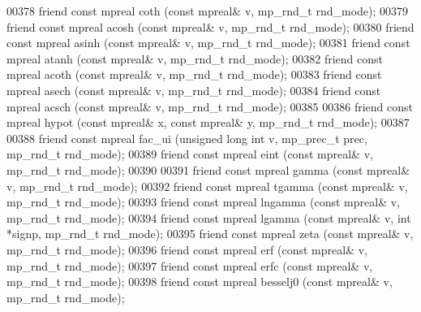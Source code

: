 \begin{DoxyCode}
00378     \textcolor{keyword}{friend} \textcolor{keyword}{const} mpreal coth  (\textcolor{keyword}{const} mpreal& v, mp\_rnd\_t rnd\_mode);
00379     \textcolor{keyword}{friend} \textcolor{keyword}{const} mpreal acosh (\textcolor{keyword}{const} mpreal& v, mp\_rnd\_t rnd\_mode);
00380     \textcolor{keyword}{friend} \textcolor{keyword}{const} mpreal asinh (\textcolor{keyword}{const} mpreal& v, mp\_rnd\_t rnd\_mode);
00381     \textcolor{keyword}{friend} \textcolor{keyword}{const} mpreal atanh (\textcolor{keyword}{const} mpreal& v, mp\_rnd\_t rnd\_mode);
00382     \textcolor{keyword}{friend} \textcolor{keyword}{const} mpreal acoth (\textcolor{keyword}{const} mpreal& v, mp\_rnd\_t rnd\_mode);
00383     \textcolor{keyword}{friend} \textcolor{keyword}{const} mpreal asech (\textcolor{keyword}{const} mpreal& v, mp\_rnd\_t rnd\_mode);
00384     \textcolor{keyword}{friend} \textcolor{keyword}{const} mpreal acsch (\textcolor{keyword}{const} mpreal& v, mp\_rnd\_t rnd\_mode);
00385 
00386     \textcolor{keyword}{friend} \textcolor{keyword}{const} mpreal hypot (\textcolor{keyword}{const} mpreal& x, \textcolor{keyword}{const} mpreal& y, mp\_rnd\_t rnd\_mode);
00387 
00388     \textcolor{keyword}{friend} \textcolor{keyword}{const} mpreal fac\_ui (\textcolor{keywordtype}{unsigned} \textcolor{keywordtype}{long} \textcolor{keywordtype}{int} v,  mp\_prec\_t prec, mp\_rnd\_t rnd\_mode);
00389     \textcolor{keyword}{friend} \textcolor{keyword}{const} mpreal eint   (\textcolor{keyword}{const} mpreal& v, mp\_rnd\_t rnd\_mode);
00390 
00391     \textcolor{keyword}{friend} \textcolor{keyword}{const} mpreal gamma    (\textcolor{keyword}{const} mpreal& v, mp\_rnd\_t rnd\_mode);
00392     \textcolor{keyword}{friend} \textcolor{keyword}{const} mpreal tgamma   (\textcolor{keyword}{const} mpreal& v, mp\_rnd\_t rnd\_mode);
00393     \textcolor{keyword}{friend} \textcolor{keyword}{const} mpreal lngamma  (\textcolor{keyword}{const} mpreal& v, mp\_rnd\_t rnd\_mode);
00394     \textcolor{keyword}{friend} \textcolor{keyword}{const} mpreal lgamma   (\textcolor{keyword}{const} mpreal& v, \textcolor{keywordtype}{int} *signp, mp\_rnd\_t rnd\_mode);
00395     \textcolor{keyword}{friend} \textcolor{keyword}{const} mpreal zeta     (\textcolor{keyword}{const} mpreal& v, mp\_rnd\_t rnd\_mode);
00396     \textcolor{keyword}{friend} \textcolor{keyword}{const} mpreal erf      (\textcolor{keyword}{const} mpreal& v, mp\_rnd\_t rnd\_mode);
00397     \textcolor{keyword}{friend} \textcolor{keyword}{const} mpreal erfc     (\textcolor{keyword}{const} mpreal& v, mp\_rnd\_t rnd\_mode);
00398     \textcolor{keyword}{friend} \textcolor{keyword}{const} mpreal besselj0 (\textcolor{keyword}{const} mpreal& v, mp\_rnd\_t rnd\_mode);

\end{DoxyCode}
